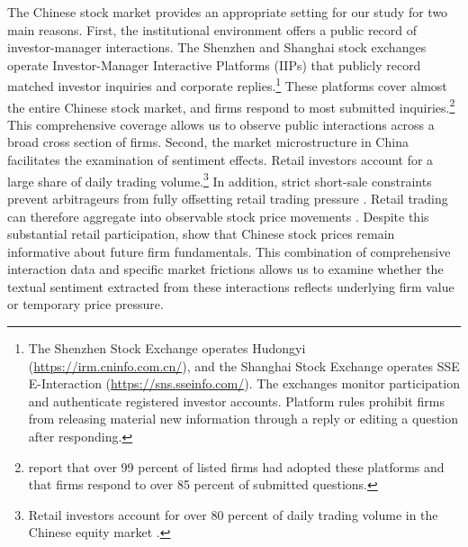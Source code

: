 \documentclass[12pt]{article}
\begin{document}
The Chinese stock market provides an appropriate setting for our study for two main reasons. First, the institutional environment offers a public record of investor-manager interactions. The Shenzhen and Shanghai stock exchanges operate Investor-Manager Interactive Platforms (IIPs) that publicly record matched investor inquiries and corporate replies.\footnote{The Shenzhen Stock Exchange operates Hudongyi (\url{https://irm.cninfo.com.cn/}), and the Shanghai Stock Exchange operates SSE E-Interaction (\url{https://sns.sseinfo.com/}). The exchanges monitor participation and authenticate registered investor accounts. Platform rules prohibit firms from releasing material new information through a reply or editing a question after responding.} These platforms cover almost the entire Chinese stock market, and firms respond to most submitted inquiries.\footnote{\citet{lee2022shall} report that over 99 percent of listed firms had adopted these platforms and that firms respond to over 85 percent of submitted questions.} This comprehensive coverage allows us to observe public interactions across a broad cross section of firms. Second, the market microstructure in China facilitates the examination of sentiment effects. Retail investors account for a large share of daily trading volume.\footnote{Retail investors account for over 80 percent of daily trading volume in the Chinese equity market \citep{liao2022}.} In addition, strict short-sale constraints prevent arbitrageurs from fully offsetting retail trading pressure \citep{jiang2022}. Retail trading can therefore aggregate into observable stock price movements \citep{bian2026,liao2022}. Despite this substantial retail participation, \citet{carpenter2021} show that Chinese stock prices remain informative about future firm fundamentals. This combination of comprehensive interaction data and specific market frictions allows us to examine whether the textual sentiment extracted from these interactions reflects underlying firm value or temporary price pressure.
\end{document}

